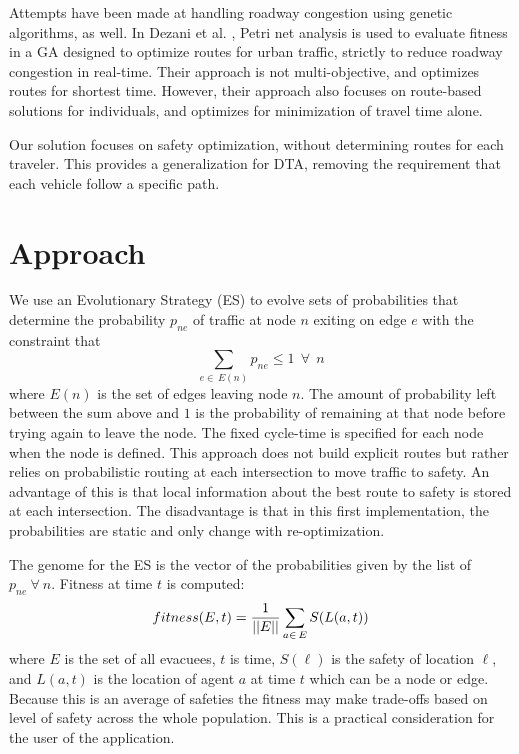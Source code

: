 \documentclass{sig-alternate-05-2015}
\begin{document}
Attempts have been made at handling roadway congestion using genetic
algorithms, as well. In Dezani et al. \cite{dezani2014optimizing},
Petri net analysis is used to evaluate fitness in a GA designed to
optimize routes for urban traffic, strictly to reduce roadway
congestion in real-time. Their approach is not multi-objective, and
optimizes routes for shortest time.  However, their approach also
focuses on route-based solutions for individuals, and optimizes for
minimization of travel time alone. 

Our solution focuses on safety optimization, without determining 
routes for each traveler. This provides a generalization for DTA,
removing the requirement that each vehicle follow a specific path.

\section{Approach}\label{sec:approach}
We use an Evolutionary Strategy (ES) \cite{Eiben15} to evolve sets of
probabilities that determine the probability $p_{ne}$
of traffic at node $n$ exiting on edge $e$ with the constraint
that
\begin{equation}
\sum_{e\in\,E(n)}  p_{ne} \leq 1 ~~ \forall ~~ n
\end{equation}
\noindent
where $E(n)$ is the set of edges leaving node $n$.
The amount of probability left between the sum above and $1$ is the
probability of remaining at that node before trying again to leave the
node.  The fixed cycle-time is specified for each node when the node
is defined.  This approach does not build explicit routes but rather
relies on probabilistic routing at each intersection to move traffic
to safety.  An advantage of this is that local information about the
best route to safety is stored at each intersection. The disadvantage
is that in this first implementation, the probabilities are static and
only change with re-optimization.

The genome for the ES is the vector of the probabilities given by the
list of $p_{ne} ~\forall~ n$.  Fitness at time $t$ is computed:
\begin{equation}
fitness(E, t) = \frac{1}{||E||} \sum_{a \in\, E} S(L(a, t))
\label{eq:safety}
\end{equation}
\noindent
where $E$ is the set of all evacuees, $t$ is time, $S(\ell)$ is the
safety of location $\ell$, and $L(a, t)$ is the location of agent $a$
at time $t$ which can be a node or edge.  Because this is an average of
safeties the fitness may make trade-offs based on level of safety
across the whole population.  This is a practical consideration for
the user of the application.
\end{document}
